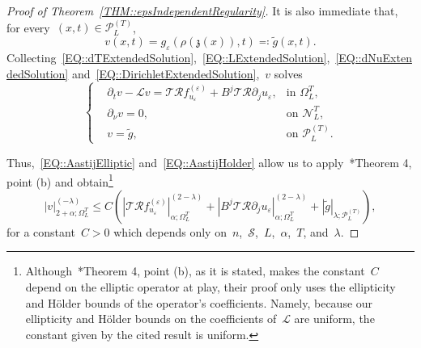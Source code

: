 \documentclass[12pt,a4paper]{amsart}
\numberwithin{equation}{section}
\theoremstyle{definition}
\theoremstyle{remark}
\newcommand{\eps}{\varepsilon}
\newcommand{\abs}[1]{\left\lvert#1\right\rvert}
\renewcommand{\leq}{\leqslant}
\begin{document}
\begin{proof}[Proof of Theorem~\ref{THM::epsIndependentRegularity}]
    It is also immediate that, for every~$(x,t)\in \mathcal{P}_L^{(T)}$,
    \begin{equation}\label{EQ::DirichletExtendedSolution}
        v(x,t) = g_\eps(\rho(\mathfrak{z}(x)),t) \eqcolon \tilde{g}(x,t).
    \end{equation}
    Collecting~\eqref{EQ::dTExtendedSolution},~\eqref{EQ::LExtendedSolution},~\eqref{EQ::dNuExtendedSolution} and~\eqref{EQ::DirichletExtendedSolution},~$v$ solves
    \begin{equation}
        \left\{\begin{aligned}
            &\partial_t v - \mathcal{L}v = \mathcal{T}\mathcal{R}f_{u_\eps}^{(\eps)}+ B^j\mathcal{T}\mathcal{R}\partial_j u_\eps,&\text{in }\Omega_L^T,\\
            &\partial_\nu v = 0,&\text{on }\mathcal{N}_L^T,\\
            &v = \tilde{g},&\text{on }\mathcal{P}_L^{(T)}.
        \end{aligned}\right.
    \end{equation}

    Thus,~\eqref{EQ::AastijElliptic} and~\eqref{EQ::AastijHolder} allow us to apply~\cite{MR826642}*{Theorem 4, point (b)} and obtain\footnote{Although~\cite{MR826642}*{Theorem 4, point (b)}, as it is stated, makes the constant~$C$ depend on the elliptic operator at play, their proof only uses the ellipticity and Hölder bounds of the operator's coefficients. Namely, because our ellipticity and Hölder bounds on the coefficients of~$\mathcal{L}$ are uniform, the constant given by the cited result is uniform.}
    \begin{equation}\label{EQ::LinearSchauderEstForExtension}
        \abs{v}_{2+\alpha; \Omega_L^T}^{(-\lambda)} \leq C \left(\abs{\mathcal{T}\mathcal{R}f_{u_\eps}^{(\eps)}}_{\alpha; \Omega_L^T}^{(2-\lambda)} + \abs{B^j\mathcal{T}\mathcal{R}\partial_j u_\eps}_{\alpha; \Omega_L^T}^{(2-\lambda)} + \abs{\tilde{g}}_{\lambda; \mathcal{P}_L^{(T)}}\right),
    \end{equation}
    for a constant~$C>0$ which depends only on~$n$,~$\mathcal{S}$,~$L$,~$\alpha$,~$T$, and~$\lambda$.


\end{proof}
\end{document}
